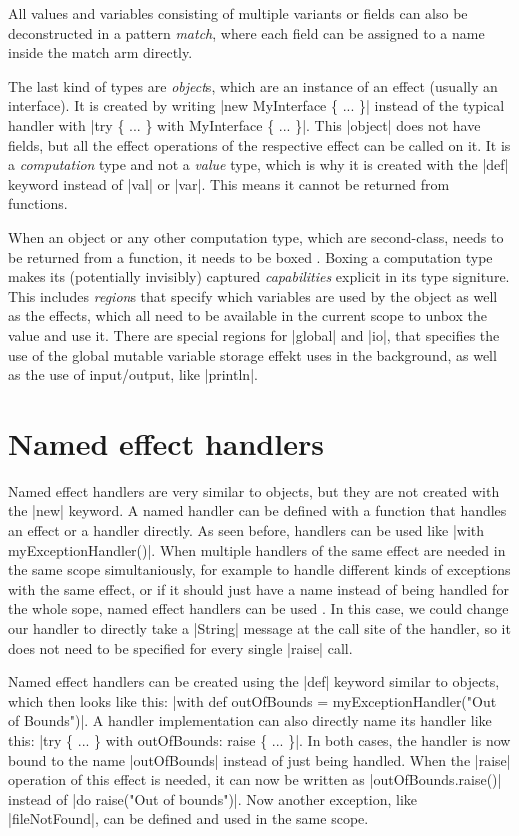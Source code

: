All values and variables consisting of multiple variants or fields can also be deconstructed in a pattern \textit{match}, where each field can be assigned to a name inside the match arm directly.

The last kind of types are \textit{object}s, which are an instance of an effect (usually an interface). It is created by writing |new MyInterface \{ ... \}| instead of the typical handler with |try \{ ... \} with MyInterface \{ ... \}|. This |object| does not have fields, but all the effect operations of the respective effect can be called on it. It is a \textit{computation} type and not a \textit{value} type, which is why it is created with the |def| keyword instead of |val| or |var|. This means it cannot be returned from functions.

When an object or any other computation type, which are second-class, needs to be returned from a function, it needs to be boxed \cite{brachthauser2022effects}. Boxing a computation type makes its (potentially invisibly) captured \textit{capabilities} explicit in its type signiture. This includes \textit{region}s that specify which variables are used by the object \cite{muller2023capabilities} as well as the effects, which all need to be available in the current scope to unbox the value and use it. There are special regions for |global| and |io|, that specifies the use of the global mutable variable storage effekt uses in the background, as well as the use of input/output, like |println|.

\section{Named effect handlers}

Named effect handlers are very similar to objects, but they are not created with the |new| keyword. A named handler can be defined with a function that handles an effect or a handler directly. As seen before, handlers can be used like |with myExceptionHandler()|. When multiple handlers of the same effect are needed in the same scope simultaniously, for example to handle different kinds of exceptions with the same effect, or if it should just have a name instead of being handled for the whole sope, named effect handlers can be used \cite{xie2022named}. In this case, we could change our handler to directly take a |String| message at the call site of the handler, so it does not need to be specified for every single |raise| call.

Named effect handlers can be created using the |def| keyword similar to objects, which then looks like this: |with def outOfBounds = myExceptionHandler("Out of Bounds")|. A handler implementation can also directly name its handler like this: |try \{ ... \} with outOfBounds: raise \{ ... \}|. In both cases, the handler is now bound to the name |outOfBounds| instead of just being handled. When the |raise| operation of this effect is needed, it can now be written as |outOfBounds.raise()| instead of |do raise("Out of bounds")|. Now another exception, like |fileNotFound|, can be defined and used in the same scope.

